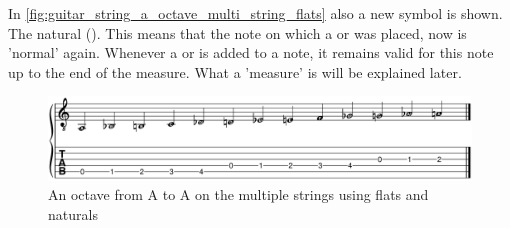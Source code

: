 In \autoref{fig:guitar_string_a_octave_multi_string_flats} also a new symbol is shown. The natural (\natural). This means that the note on which a \flat or \sharp was placed, now is 'normal' again. Whenever a \flat or \sharp is added to a note, it remains valid for this note up to the end of the measure. What a 'measure' is will be explained later.

\begin{figure}[h]
	\centering
	\includegraphics[width=\textwidth]{../../MuseScore/Guitar/PitchesFlatsMultiString.png}
	\caption{An octave from A to A on the multiple strings using flats and naturals}
	\label{fig:guitar_string_a_octave_multi_string_flats}
\end{figure}